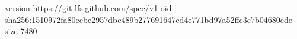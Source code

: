 version https://git-lfs.github.com/spec/v1
oid sha256:1510972fa80ecbe2957dbc489b277691647cd4e771bd97a52ffc3e7b04680ede
size 7480
